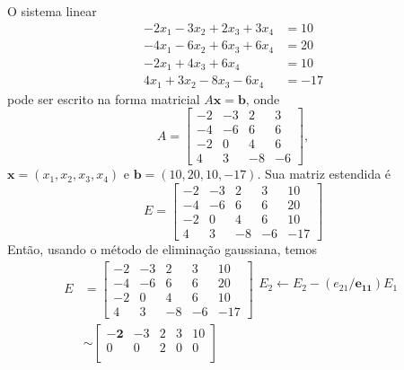\begin{ex}\label{ex:egauss_exec}
  O sistema linear
  \begin{align}
    -2x_1 - 3x_2 + 2x_3 + 3x_4 &= 10\label{eq:ex_egauss_exec_sl_1}\\
    -4x_1 - 6x_2 + 6x_3 + 6x_4 &= 20\\
    -2x_1 + 4x_3 + 6x_4 &= 10\\
    4x_1 + 3x_2 - 8x_3 - 6x_4 &= -17\label{eq:ex_egauss_exec_sl_4}
  \end{align}
pode ser escrito na forma matricial $A\pmb{x}=\pmb{b}$, onde
\begin{equation}
  A =
  \begin{bmatrix}
    -2 & -3 & 2 & 3\\
    -4 & -6 & 6 & 6\\
    -2 & 0 & 4 & 6 \\
    4 & 3 & -8 & -6
  \end{bmatrix},
\end{equation}
$\pmb{x} = (x_1, x_2, x_3, x_4)$ e $\pmb{b} = (10, 20, 10, -17)$. Sua matriz estendida é
\begin{equation}
  E =
  \begin{bmatrix}
    -2 & -3 & 2 & 3 & 10\\
    -4 & -6 & 6 & 6 & 20\\
    -2 & 0 & 4 & 6 & 10\\
    4 & 3 & -8 & -6 & -17
  \end{bmatrix}
\end{equation}
Então, usando o método de eliminação gaussiana, temos
\begin{align}
  E &=
  \begin{bmatrix}
    -2 & -3 & 2 & 3 & 10\\
    -4 & -6 & 6 & 6 & 20\\
    -2 & 0 & 4 & 6 & 10\\
    4 & 3 & -8 & -6 & -17
  \end{bmatrix}
  \begin{matrix}
  \\
  E_2\leftarrow E_2 - (e_{21}/\pmb{e_{11}})E_1\\
  \\
  \\
  \end{matrix}\\
  &\sim 
  \begin{bmatrix}
    \pmb{-2} & -3 & 2 & 3 & 10\\
    0 & 0 & 2 & 0 & 0\\

\end{bmatrix}
\end{align}
\end{ex}
